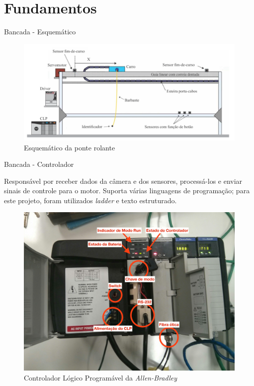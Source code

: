 \documentclass[10pt]{beamer}
\begin{document}
\section{Fundamentos}


\begin{frame}[fragile]{Bancada - Esquemático}
\begin{figure}[!ht]
	\centering
	\includegraphics[width=.9\linewidth]{figures/fundamentos/bancadaEsquematico}
	\caption{Esquemático da ponte rolante \cite{redytton}}
	\label{bancadaesq}
\end{figure}
\end{frame}

\begin{frame}[fragile]{Bancada - Controlador}
\begin{block}{}
Responsável por receber dados da câmera e dos sensores, processá-los e enviar sinais de controle para o motor. Suporta várias linguagens de programação; para este projeto, foram utilizados \textit{ladder} e texto estruturado.
\end{block}
\begin{figure}[!ht]
	\centering
	\includegraphics[width=.5\linewidth]{figures/fundamentos/CLP}
	\caption{Controlador Lógico Programável da \textit{Allen-Bradley}}
	\label{clpfig}
\end{figure}
\end{frame}
\end{document}
